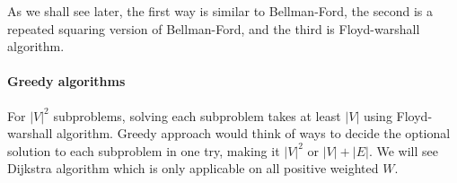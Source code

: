 \documentclass[../main.tex]{subfiles}
\begin{document}
As we shall see later, the first way is similar to Bellman-Ford, the second is a repeated squaring version of Bellman-Ford, and the third is Floyd-warshall algorithm.

\paragraph{Greedy algorithms} For $|V|^2$ subproblems, solving each subproblem takes at least $|V|$ using Floyd-warshall algorithm. Greedy approach would think of ways to decide the optional solution to each subproblem in one try, making it $|V|^2$ or $|V|+|E|$. We will see Dijkstra algorithm which is only applicable on all positive weighted $W$. 




\end{document}
